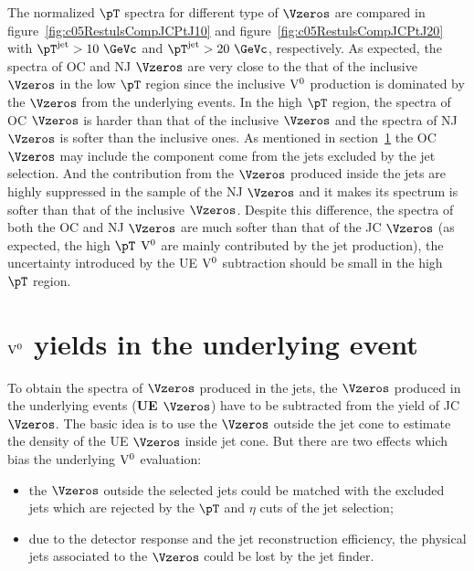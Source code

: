 The normalized $\pT$ spectra for different type of $\Vzeros$ are
compared in figure~\ref{fig:c05RestulsCompJCPtJ10} and
figure~\ref{fig:c05RestulsCompJCPtJ20}
with $\pT^{\rm jet}>10~\GeVc$ and $\pT^{\rm jet}>20~\GeVc$, respectively.
As expected, the spectra of OC and NJ $\Vzeros$ are very close to the that
of the inclusive $\Vzeros$ in the low $\pT$ region since the
inclusive ${\rm V}^{0}$ production is dominated by the $\Vzeros$ from
the underlying events.
In the high $\pT$ region,
the spectra of OC $\Vzeros$ is harder than that of the inclusive $\Vzeros$
and the spectra of NJ $\Vzeros$ is softer than the inclusive ones.
As mentioned in section~\ref{sec:c05EstiV0sUE} the OC $\Vzeros$ may include
the component come from the jets excluded by the jet selection.
And the contribution from the $\Vzeros$ produced inside the jets are
highly suppressed in the sample of the NJ $\Vzeros$ and it makes its
spectrum is softer than that of the inclusive $\Vzeros$.
Despite this difference, the spectra of both the OC and NJ $\Vzeros$
are much softer than that of the JC $\Vzeros$ (as expected,
the high $\pT$ ${\rm V}^{0}$ are mainly contributed by the jet production),
the uncertainty introduced by the UE ${\rm V}^{0}$ subtraction should be
small in the high $\pT$ region.




\section{${\rm V}^{0}$ yields in the underlying event}
\label{sec:c05EstiV0sUE}

To obtain the spectra of $\Vzeros$ produced in the jets,
the $\Vzeros$ produced in the underlying events ({\bf UE $\mathbf\Vzeros$})
have to be subtracted from the yield of JC $\Vzeros$.
The basic idea is to use the $\Vzeros$ outside the jet cone to estimate
the density of the UE $\Vzeros$ inside jet cone.
But there are two effects which bias the underlying ${\rm V}^{0}$ evaluation:
\begin{itemize}
\item the $\Vzeros$ outside the selected jets could be
      matched with the excluded jets which are rejected by
      the $\pT$ and $\eta$ cuts of the jet selection;
\item due to the detector response and the jet reconstruction efficiency,
      the physical jets associated to the $\Vzeros$ could be lost by the
      jet finder.
\end{itemize}

